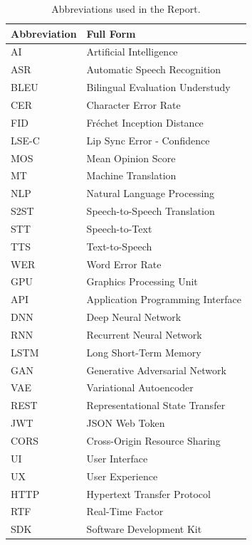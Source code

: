 \documentclass[12pt,oneside]{report}
\begin{document}
\begin{table}[H]
\centering
\caption{Abbreviations used in the Report.}
\label{tab:abbrev}
\renewcommand{\arraystretch}{1.05}
\setlength{\tabcolsep}{4.5pt}
\small
\begin{tabular}{@{}ll@{}}
\toprule
\textbf{Abbreviation} & \textbf{Full Form} \\
\midrule
AI & Artificial Intelligence \\
ASR & Automatic Speech Recognition \\
BLEU & Bilingual Evaluation Understudy \\
CER & Character Error Rate \\
FID & Fréchet Inception Distance \\
LSE-C & Lip Sync Error - Confidence \\
MOS & Mean Opinion Score \\
MT & Machine Translation \\
NLP & Natural Language Processing \\
S2ST & Speech-to-Speech Translation \\
STT & Speech-to-Text \\
TTS & Text-to-Speech \\
WER & Word Error Rate \\
GPU & Graphics Processing Unit \\
API & Application Programming Interface \\
DNN & Deep Neural Network \\
RNN & Recurrent Neural Network \\
LSTM & Long Short-Term Memory \\
GAN & Generative Adversarial Network \\
VAE & Variational Autoencoder \\
REST & Representational State Transfer \\
JWT & JSON Web Token \\
CORS & Cross-Origin Resource Sharing \\
UI & User Interface \\
UX & User Experience \\
HTTP & Hypertext Transfer Protocol \\
RTF & Real-Time Factor \\
SDK & Software Development Kit \\
\bottomrule
\end{tabular}
\end{table}

\end{document}
